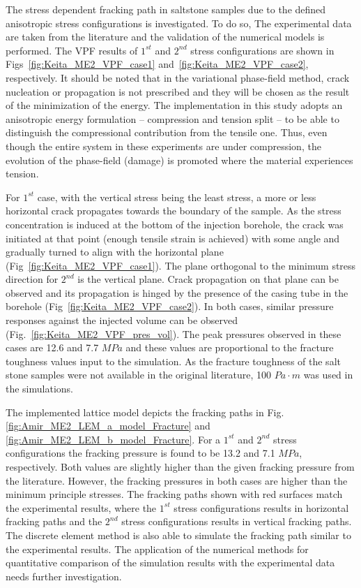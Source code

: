  The stress dependent fracking path in saltstone samples due to the defined anisotropic stress configurations is investigated. To do so,  The experimental data are taken from the literature and the validation of the numerical models is performed. 
 The VPF results of  $1^{st}$ and $2^{nd}$ stress configurations are shown in Figs~\ref{fig:Keita_ME2_VPF_case1} and~\ref{fig:Keita_ME2_VPF_case2}, respectively.
 It should be noted that in the variational phase-field method, crack nucleation or propagation is not prescribed and they will be chosen as the result of the minimization of the energy.
 The implementation in this study adopts an anisotropic energy formulation -- compression and tension split -- to be able to distinguish the compressional contribution from the tensile one.
 Thus, even though the entire system in these experiments are under compression, the evolution of the phase-field (damage) is promoted where the material experiences tension.
 
 For $1^{st}$ case, with the vertical stress being the least stress, a more or less horizontal crack propagates towards the boundary of the sample.
 As the stress concentration is induced at the bottom of the injection borehole, the crack was initiated at that point (enough tensile strain is achieved) with some angle and gradually turned to align with the horizontal plane (Fig~\ref{fig:Keita_ME2_VPF_case1}).
 The plane orthogonal to the minimum stress direction for $2^{nd}$ is the vertical plane.
 Crack propagation on that plane can be observed and its propagation is hinged by the presence of the casing tube in the borehole (Fig~\ref{fig:Keita_ME2_VPF_case2}).
 In both cases, similar pressure responses against the injected volume can be observed (Fig.~\ref{fig:Keita_ME2_VPF_pres_vol}). 
 The peak pressures observed in these cases are 12.6 and 7.7 $MPa$ and these values are proportional to the fracture toughness values input to the simulation.
 As the fracture toughness of the salt stone samples were not available in the original literature, 100 $Pa \cdot m$ was used in the simulations. 
 
 The implemented lattice model depicts the fracking paths in Fig.  \ref{fig:Amir_ME2_LEM_a_model_Fracture} and \ref{fig:Amir_ME2_LEM_b_model_Fracture}. For a $1^{st}$ and $2^{nd}$ stress configurations the fracking pressure is found to be 13.2 and 7.1 $MPa$, respectively. Both values are slightly higher than the given fracking pressure from the literature. However, the fracking pressures in both cases are higher than the minimum principle stresses. The fracking paths shown with red surfaces match the experimental results, where the $1^{st}$ stress configurations results in horizontal fracking paths and the $2^{nd}$ stress configurations results in vertical fracking paths. The discrete element method is also able to simulate the fracking path similar to the experimental results. The application of the numerical methods for quantitative comparison of the simulation results with the experimental data needs further investigation. 
